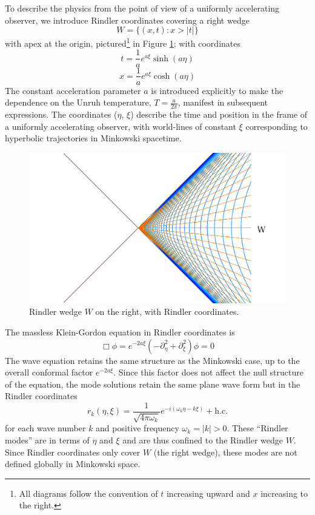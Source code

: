 \documentclass[12pt,a4paper]{article}
\begin{document}
To describe the physics from the point of view of a uniformly accelerating observer, we introduce Rindler coordinates \cite{frodden2018unruh,rindler1966kruskal} covering a right wedge 
\begin{equation}
  W = \{(x,t) : x>|t|\}
\end{equation}
with apex at the origin, pictured\footnote{All diagrams follow the convention of $t$ increasing upward and $x$ increasing to the right.} in Figure \ref{rindlerw}; with coordinates
\begin{equation}
  t = \frac{1}{a}e^{a\xi}\sinh{(a\eta)}
\label{sinh}
\end{equation}
\begin{equation}
x = \frac{1}{a}e^{a\xi}\cosh{(a\eta)}
\end{equation}
The constant acceleration parameter $a$ is introduced explicitly to make the dependence on the Unruh temperature, $T = \frac{a}{2\pi}$, manifest in subsequent expressions. The coordinates ($\eta$, $\xi$) describe the time and position in the frame of a uniformly accelerating observer, with world-lines of constant $\xi$ corresponding to hyperbolic trajectories in Minkowski spacetime.

\begin{figure}[h]
\centering
\includegraphics[scale=0.2]{rindler_w.png}
\caption{Rindler wedge $W$ on the right, with Rindler coordinates.}
\label{rindlerw}
\end{figure}

The massless Klein-Gordon equation in Rindler coordinates is
\begin{equation}
  \Box \phi = e^{-2a \xi}(-\partial_\eta^2 + \partial_\xi^2) \phi = 0
\end{equation}
The wave equation retains the same structure as the Minkowski case, up to the overall conformal factor $e^{-2a\xi}$. Since this factor does not affect the null structure of the equation, the mode solutions retain the same plane wave form but in the Rindler coordinates
\begin{equation}
 r_k(\eta,\xi) = \frac{1}{\sqrt{4 \pi \omega_k}} e^{-i(\omega_k \eta -k \xi)} + \text{h.c.}
\end{equation}
for each wave number $k$ and positive frequency $\omega_k = |k| > 0$.  These ``Rindler modes'' are in terms of $\eta$ and $\xi$ and are thus confined to the Rindler wedge $W$.  Since Rindler coordinates only cover $W$ (the right wedge), these modes are not defined globally in Minkowski space.
\end{document}

